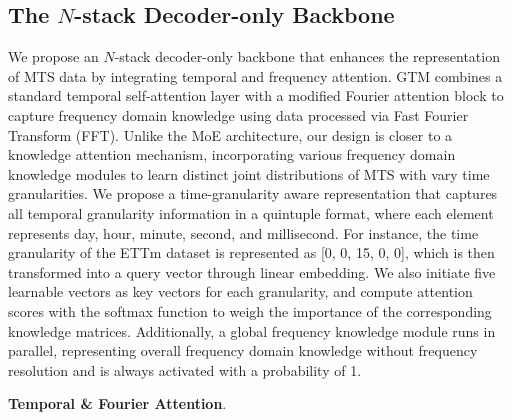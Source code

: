 \subsection{The $N$-stack Decoder-only Backbone}
\label{subsec:FA}

We propose an $N$-stack decoder-only backbone that enhances the representation of MTS data by integrating temporal and frequency attention. 
GTM combines a standard temporal self-attention layer with a modified Fourier attention block to capture frequency domain knowledge using data processed via Fast Fourier Transform (FFT).
Unlike the MoE\cite{Lepikhin21} architecture, our design is closer to a knowledge attention mechanism, incorporating various frequency domain knowledge modules to learn distinct joint distributions of MTS with vary time granularities.   
We propose a time-granularity aware representation that captures all temporal granularity information in a quintuple format, where each element represents day, hour, minute, second, and millisecond. 
For instance, the time granularity of the ETTm dataset\cite{Wu21} is represented as [0, 0, 15, 0, 0], which is then transformed into a query vector through linear embedding. 
We also initiate five learnable vectors as key vectors for each granularity, and compute attention scores with the softmax function to weigh the importance of the corresponding knowledge matrices. Additionally, a global frequency knowledge module runs in parallel, representing overall frequency domain knowledge without frequency resolution and is always activated with a probability of 1.

\textbf{Temporal \& Fourier Attention}.

